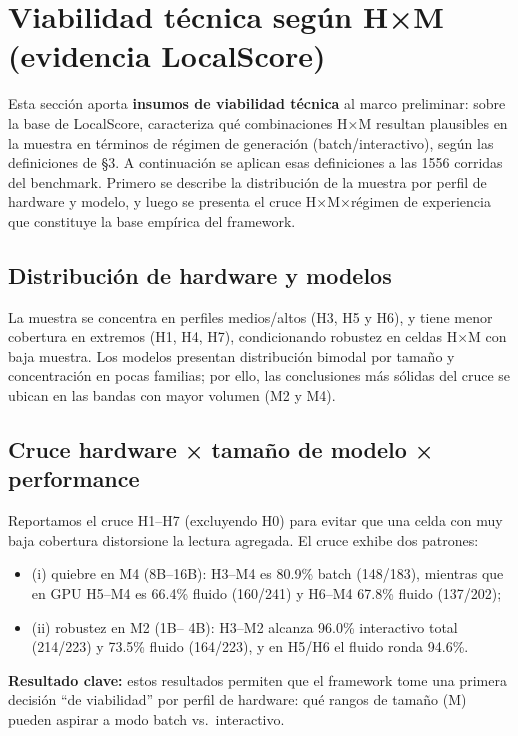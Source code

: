 \documentclass{llncs}
\begin{document}
\section{Viabilidad técnica según H×M (evidencia LocalScore)}\label{resultados-cuantitativos}

Esta sección aporta \textbf{insumos de viabilidad técnica} al marco preliminar: sobre la base de LocalScore, caracteriza qué combinaciones H×M resultan plausibles en la muestra en términos de régimen de generación (batch/interactivo), según las definiciones de §3. A continuación se aplican esas definiciones a las 1556 corridas del benchmark. Primero se describe la distribución de la muestra por perfil de hardware y modelo, y luego se presenta el cruce H×M×régimen de experiencia que constituye la base empírica del framework.

\subsection{Distribución de hardware y modelos}\label{distribuciuxf3n-de-hardware-y-modelos}

La muestra se concentra en perfiles medios/altos (H3, H5 y H6), y tiene
menor cobertura en extremos (H1, H4, H7), condicionando robustez en
celdas H×M con baja muestra. Los modelos presentan distribución bimodal
por tamaño y concentración en pocas familias; por ello, las conclusiones
más sólidas del cruce se ubican en las bandas con mayor volumen (M2 y
M4).

\subsection{Cruce hardware × tamaño de modelo × performance}\label{cruce-hardware-tamauxf1o-de-modelo-performance}

Reportamos el cruce H1--H7 (excluyendo H0) para evitar que una celda con
muy baja cobertura distorsione la lectura agregada. El cruce exhibe dos
patrones: 
\begin{itemize}
    \item (i) quiebre en M4 (8B--16B): H3--M4 es 80.9\% batch (148/183), mientras que en GPU H5--M4 es 66.4\% fluido (160/241) y H6--M4 67.8\% fluido (137/202);
    \item (ii) robustez en M2 (1B-- 4B): H3--M2 alcanza 96.0\% interactivo total (214/223) y 73.5\% fluido (164/223), y en H5/H6 el fluido ronda 94.6\%.
\end{itemize}

\textbf{Resultado clave:} estos resultados permiten que el framework tome una
primera decisión ``de viabilidad'' por perfil de hardware: qué rangos de
tamaño (M) pueden aspirar a modo batch vs.~interactivo.
\end{document}
